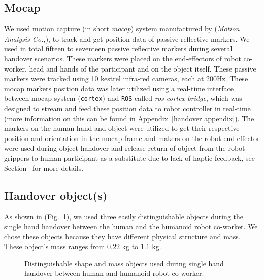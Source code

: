 \subsection{Mocap}
We used motion capture (in short \textit{mocap}) system manufactured by ({\it Motion Analysis Co.,}), to track and get position data of passive reflective markers. We used in total fifteen to seventeen passive reflective markers during several handover scenarios. These markers were placed on the end-effectors of robot co-worker, head and hands of the participant and on the object itself. These passive markers were tracked using 10 kestrel infra-red cameras, each at 200Hz. These mocap markers position data was later utilized using a real-time interface between mocap system (\texttt{cortex}) and \texttt{ROS} called \textit{ros-cortex-bridge}, which was designed to stream and feed these position data to robot controller in real-time (more information on this can be found in Appendix~\ref{handover appendix}). The markers on the human hand and object were utilized to get their respective position and orientation in the mocap frame and makers on the robot end-effector were used during object handover and release-return of object from  the robot grippers to human participant as a substitute due to lack of haptic feedback, see Section~ for more details.

\subsection{Handover object(s)}

As shown in (Fig.~\ref{fig:objects}), we used three easily distinguishable objects during the single hand handover between the human and the humanoid robot co-worker. We chose these objects because they have different physical structure and mass. These object's mass ranges from $0.22$ kg to $1.1$ kg.


\begin{figure}[htpb]
	\caption{Distinguishable shape and mass objects used during single hand handover between human and humanoid robot co-worker.}
	\label{fig:objects}
\end{figure}



